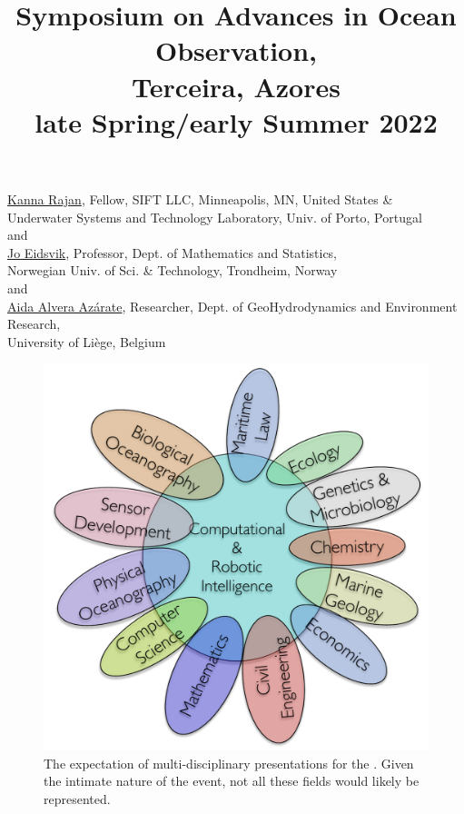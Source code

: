\documentclass[10pt,letterpaper]{article}
\title{Symposium on Advances in Ocean Observation,\\
  Terceira, Azores \\ \large{\textbf{late Spring/early Summer 2022}}}
\date{}
\begin{document}
\maketitle{}

\vspace{-1.75cm}
\begin{center}
  \href{https://kanna.rajan.systems}{\textsf{Kanna Rajan}},
  Fellow, SIFT LLC, Minneapolis, MN, United States \& \\Underwater Systems and Technology
  Laboratory, Univ. of Porto, Portugal\\
  and\\
  \href{https://www.ntnu.edu/employees/jo.eidsvik}{\textsf{Jo Eidsvik}},
  Professor, Dept. of Mathematics and Statistics, \\Norwegian Univ. of
  Sci. \& Technology, Trondheim, Norway\\
  and\\
  \href{http://modb.oce.ulg.ac.be/mediawiki/index.php/User:Aida}{\textsf{Aida Alvera Az\'{a}rate}},
  Researcher, Dept. of GeoHydrodynamics and Environment Research,\\
  University of Li\`{e}ge, Belgium
\end{center}

\begin{figure}
  \vspace{-0.5cm}
  \centering 
  \includegraphics[scale=0.4]{fig/disciplines.pdf}
  \caption{The expectation of multi-disciplinary presentations for the
    \sympe. Given the intimate nature of the event, not all these
    fields would likely be represented.}
  \label{fig:concept}
  \vspace{-0.5cm}
\end{figure}
\end{document}
